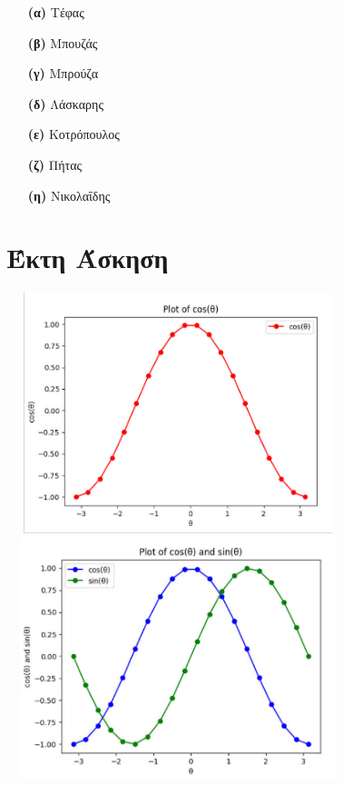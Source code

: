 \documentclass{article}
\begin{document}
\begin{itemize}
\item[\textbf{(α)}] Τέφας
\item[\textbf{(β)}] Μπουζάς
\item[\textbf{(γ)}] Μπρούζα
\item[\textbf{(δ)}] Λάσκαρης
\item[\textbf{(ε)}] Κοτρόπουλος
\item[\textbf{(ζ)}] Πήτας
\item[\textbf{(η)}] Νικολαΐδης
\end{itemize}

\section{Έκτη Άσκηση}
\begin{center}
\includegraphics[width=10cm, height=7cm]{cos chart.png} \\
\includegraphics[width=10cm, height=7cm]{cos and sin chart.png}
\end{center}
\end{document}

